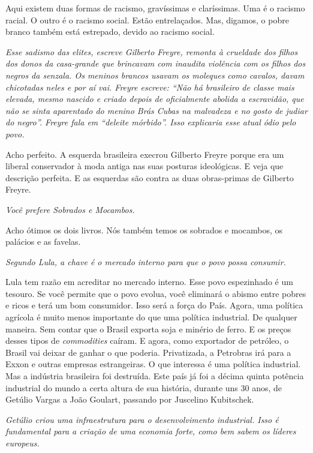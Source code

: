 \normalfont
Aqui existem duas formas de racismo, gravíssimas e
claríssimas. Uma é o racismo racial. O outro é o racismo social. Estão
entrelaçados. Mas, digamos, o pobre branco também está estrepado, devido
ao racismo social.

\itshape
 Esse sadismo das elites, escreve Gilberto Freyre,
remonta à crueldade dos filhos dos donos da casa-grande que brincavam
com inaudita violência com os filhos dos negros da senzala. Os meninos
brancos usavam os moleques como cavalos, davam chicotadas neles e por aí
vai. Freyre escreve: ``Não há brasileiro de classe mais elevada, mesmo
nascido e criado depois de oficialmente abolida a escravidão, que não se
sinta aparentado do menino Brás Cubas na malvadeza e no gosto de judiar
do negro''. Freyre fala em ``deleite mórbido''. Isso explicaria esse
atual ódio pelo povo.

\normalfont
Acho perfeito. A esquerda brasileira execrou Gilberto
Freyre porque era um liberal conservador à moda antiga nas suas posturas
ideológicas. E veja que descrição perfeita. E as esquerdas são contra as
duas obras-primas de Gilberto Freyre.

\itshape
 Você prefere \emph{Sobrados e Mocambos}.

\normalfont
Acho ótimos os dois livros. Nós também temos os sobrados
e mocambos, os palácios e as favelas.

\itshape
 Segundo Lula, a chave é o mercado interno para que o
povo possa consumir.

\normalfont
Lula tem razão em acreditar no mercado interno. Esse povo
espezinhado é um tesouro. Se você permite que o povo evolua, você
eliminará o abismo entre pobres e ricos e terá um bom consumidor. Isso
será a força do País. Agora, uma política agrícola é muito menos
importante do que uma política industrial. De qualquer maneira. Sem
contar que o Brasil exporta soja e minério de ferro. E os preços desses
tipos de \emph{commodities} caíram. E agora, como exportador de
petróleo, o Brasil vai deixar de ganhar o que poderia. Privatizada, a
Petrobras irá para a Exxon e outras empresas estrangeiras. O que
interessa é uma política industrial. Mas a indústria brasileira foi
destruída. Este país já foi a décima quinta potência industrial do mundo
a certa altura de sua história, durante uns 30 anos, de Getúlio Vargas a
João Goulart, passando por Juscelino Kubitschek.

\itshape
 Getúlio criou uma infraestrutura para o desenvolvimento
industrial. Isso é fundamental para a criação de uma economia forte,
como bem sabem os líderes europeus.

